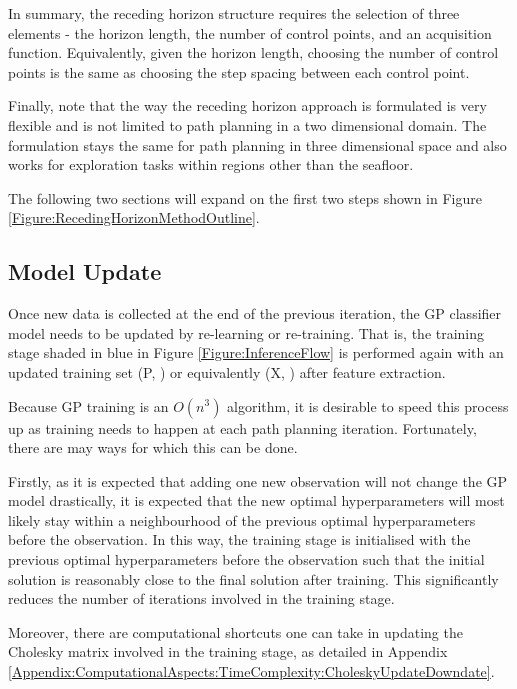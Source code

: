 			In summary, the receding horizon structure requires the selection of three elements - the horizon length, the number of control points, and an acquisition function. Equivalently, given the horizon length, choosing the number of control points is the same as choosing the step spacing between each control point. 
			
			Finally, note that the way the receding horizon approach is formulated is very flexible and is not limited to path planning in a two dimensional domain. The formulation stays the same for path planning in three dimensional space and also works for exploration tasks within regions other than the seafloor.
			
			The following two sections will expand on the first two steps shown in Figure \ref{Figure:RecedingHorizonMethodOutline}.
	
		\subsection{Model Update}
		\label{InformativeSeafloorExploration:RecedingHorizonFormulation:ModelUpdate}
				
			Once new data is collected at the end of the previous iteration, the GP classifier model needs to be updated by re-learning or re-training. That is, the training stage shaded in blue in Figure \ref{Figure:InferenceFlow} is performed again with an updated training set (P, ) or equivalently (X, ) after feature extraction.
			
			Because GP training is an $O(n^{3})$ algorithm, it is desirable to speed this process up as training needs to happen at each path planning iteration. Fortunately, there are may ways for which this can be done.
			
			Firstly, as it is expected that adding one new observation will not change the GP model drastically, it is expected that the new optimal hyperparameters will most likely stay within a neighbourhood of the previous optimal hyperparameters before the observation. In this way, the training stage is initialised with the previous optimal hyperparameters before the observation such that the initial solution is reasonably close to the final solution after training. This significantly reduces the number of iterations involved in the training stage.
			
			Moreover, there are computational shortcuts one can take in updating the Cholesky matrix involved in the training stage, as detailed in Appendix \ref{Appendix:ComputationalAspects:TimeComplexity:CholeskyUpdateDowndate}.
			
